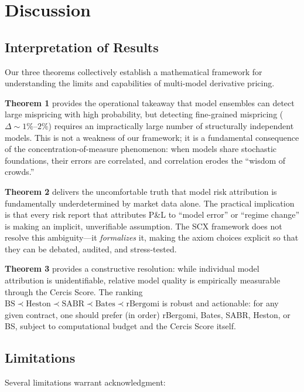 \documentclass[11pt,a4paper]{article}
\theoremstyle{plain}
\theoremstyle{definition}
\theoremstyle{remark}
\newcommand{\SCX}{\textsc{SCX}}
\newcommand{\BS}{\text{BS}}
\newcommand{\Heston}{\text{Heston}}
\newcommand{\SABR}{\text{SABR}}
\newcommand{\BatesM}{\text{Bates}}
\newcommand{\rBergomi}{\text{rBergomi}}
\begin{document}
\section{Discussion}

\subsection{Interpretation of Results}

Our three theorems collectively establish a mathematical framework for understanding the limits and capabilities of multi-model derivative pricing.

\textbf{Theorem 1} provides the operational takeaway that model ensembles can detect large mispricing with high probability, but detecting fine-grained mispricing ($\Delta \sim 1\%$--$2\%$) requires an impractically large number of structurally independent models. This is not a weakness of our framework; it is a fundamental consequence of the concentration-of-measure phenomenon: when models share stochastic foundations, their errors are correlated, and correlation erodes the ``wisdom of crowds.''

\textbf{Theorem 2} delivers the uncomfortable truth that model risk attribution is fundamentally underdetermined by market data alone. The practical implication is that every risk report that attributes P\&L to ``model error'' or ``regime change'' is making an implicit, unverifiable assumption. The \SCX{} framework does not resolve this ambiguity---it \emph{formalizes} it, making the axiom choices explicit so that they can be debated, audited, and stress-tested.

\textbf{Theorem 3} provides a constructive resolution: while individual model attribution is unidentifiable, relative model quality is empirically measurable through the Cercis Score. The ranking $\BS \prec \Heston \prec \SABR \prec \BatesM \prec \rBergomi$ is robust and actionable: for any given contract, one should prefer (in order) rBergomi, Bates, SABR, Heston, or BS, subject to computational budget and the Cercis Score itself.

\subsection{Limitations}

Several limitations warrant acknowledgment:
\end{document}
